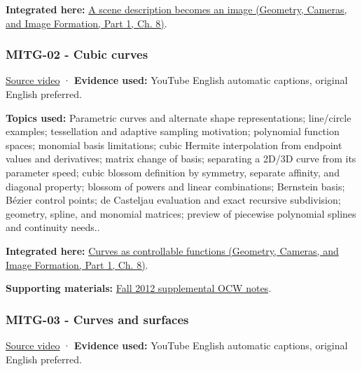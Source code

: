 \textbf{Integrated here:} \href{../03-Geometry-Cameras-and-Image-Formation-P01/main.pdf\#nameddest=03-visual-computing-i-ch001-a-scene-description-becomes-an-image}{A scene description becomes an image (Geometry, Cameras, and Image Formation, Part 1, Ch. 8)}.

\subsubsection{MITG-02 - Cubic curves}\label{04-visual-computing-ii-ch036-mitg-02---cubic-curves}

\hypertarget{04-visual-computing-ii-ch036-mitg-02---cubic-curves}{}

\href{https://www.youtube.com/watch?v=1BZ0ayVjWEk}{Source video} · \textbf{Evidence used:} YouTube English automatic captions, original English preferred.

\textbf{Topics used:} Parametric curves and alternate shape representations; line/circle examples; tessellation and adaptive sampling motivation; polynomial function spaces; monomial basis limitations; cubic Hermite interpolation from endpoint values and derivatives; matrix change of basis; separating a 2D/3D curve from its parameter speed; cubic blossom definition by symmetry, separate affinity, and diagonal property; blossom of powers and linear combinations; Bernstein basis; Bézier control points; de Casteljau evaluation and exact recursive subdivision; geometry, spline, and monomial matrices; preview of piecewise polynomial splines and continuity needs..

\textbf{Integrated here:} \href{../03-Geometry-Cameras-and-Image-Formation-P01/main.pdf\#nameddest=03-visual-computing-i-ch001-curves-as-controllable-functions}{Curves as controllable functions (Geometry, Cameras, and Image Formation, Part 1, Ch. 8)}.

\textbf{Supporting materials:} \href{https://ocw.mit.edu/courses/6-837-computer-graphics-fall-2012/pages/lecture-notes/}{Fall 2012 supplemental OCW notes}.

\subsubsection{MITG-03 - Curves and surfaces}\label{04-visual-computing-ii-ch036-mitg-03---curves-and-surfaces}

\hypertarget{04-visual-computing-ii-ch036-mitg-03---curves-and-surfaces}{}

\href{https://www.youtube.com/watch?v=LzIjSdNoR9s}{Source video} · \textbf{Evidence used:} YouTube English automatic captions, original English preferred.

